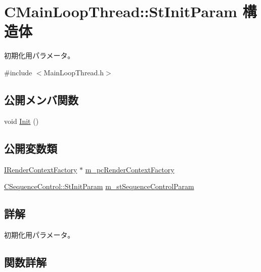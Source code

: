 \hypertarget{struct_c_main_loop_thread_1_1_st_init_param}{}\section{C\+Main\+Loop\+Thread\+:\+:St\+Init\+Param 構造体}
\label{struct_c_main_loop_thread_1_1_st_init_param}


初期化用パラメータ。  




{\ttfamily \#include $<$Main\+Loop\+Thread.\+h$>$}

\subsection*{公開メンバ関数}
\begin{DoxyCompactItemize}
\item 
void \hyperlink{struct_c_main_loop_thread_1_1_st_init_param_a89dde8cafb43478c6612ca21bc264cc2}{Init} ()
\end{DoxyCompactItemize}
\subsection*{公開変数類}
\begin{DoxyCompactItemize}
\item 
\hyperlink{class_i_render_context_factory}{I\+Render\+Context\+Factory} $\ast$ \hyperlink{struct_c_main_loop_thread_1_1_st_init_param_aaea6563bd69b3be840fa1828654329e2}{m\+\_\+pc\+Render\+Context\+Factory}
\item 
\hyperlink{struct_c_sequence_control_1_1_st_init_param}{C\+Sequence\+Control\+::\+St\+Init\+Param} \hyperlink{struct_c_main_loop_thread_1_1_st_init_param_a49c89fec67bb0ebf6e3b3968bf773f2f}{m\+\_\+st\+Sequence\+Control\+Param}
\end{DoxyCompactItemize}


\subsection{詳解}
初期化用パラメータ。 

\subsection{関数詳解}
\hypertarget{struct_c_main_loop_thread_1_1_st_init_param_a89dde8cafb43478c6612ca21bc264cc2}{}
